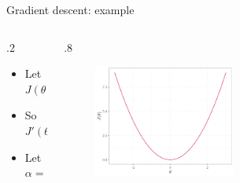 \documentclass[
  9pt,
  ignorenonframetext,
  aspectratio=169,
  t, dvipsnames]{beamer}
\providecommand{\tightlist}{%
  \setlength{\itemsep}{0pt}\setlength{\parskip}{0pt}}\usepackage{longtable,booktabs,array}
\theoremstyle{definition}
\def\begincols{\begin{columns}}
\def\begincol{\begin{column}}
\def\endcol{\end{column}}
\def\endcols{\end{columns}}
\begin{document}
\begin{frame}{Gradient descent: example}
\protect\hypertarget{gradient-descent-example}{}
\begincols
\begincol{.2\textwidth}

\begin{itemize}
\tightlist
\item
  Let \(J(\theta)=\theta^2\)
\item
  So \(J'(\theta) = 2 \theta\)
\item
  Let \(\alpha = 0.1\)
\end{itemize}

\endcol

\begincol{.8\textwidth}

\begin{figure}

{\centering \includegraphics[width=0.5\textwidth,height=\textheight]{CM1_Machine_Learning_files/figure-beamer/unnamed-chunk-14-1.pdf}

}

\end{figure}

\endcol
\endcols
\end{frame}
\end{document}
